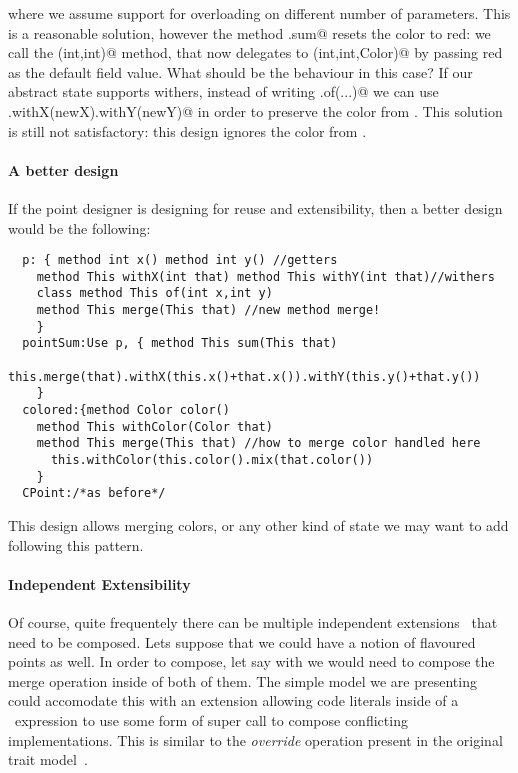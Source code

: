 \noindent 
where we assume support for overloading on different number of parameters.
This is a reasonable solution, however the method \Q@CPoint.sum@ resets
the color to red: we call the \Q@of(int,int)@ method, that now
delegates to \Q@of(int,int,Color)@ by passing red as the default field
value.  What should be the behaviour in this case?  If our abstract
state supports withers, instead of writing \Q@This.of(...)@ we can use
\Q@this.withX(newX).withY(newY)@ in order to preserve the color from
\Q@this@.  This solution is still not satisfactory: this design ignores
the color from \Q@that@.

\paragraph{A better design}
If the point designer is designing for reuse and extensibility, then 
a better design would be the following:  
\begin{lstlisting}
  p: { method int x() method int y() //getters
    method This withX(int that) method This withY(int that)//withers
    class method This of(int x,int y)
    method This merge(This that) //new method merge!
    }
  pointSum:Use p, { method This sum(This that)
      this.merge(that).withX(this.x()+that.x()).withY(this.y()+that.y())
    }
  colored:{method Color color()
    method This withColor(Color that)
    method This merge(This that) //how to merge color handled here
      this.withColor(this.color().mix(that.color())
    }
  CPoint:/*as before*/
\end{lstlisting}  
  This design allows merging colors, or any other kind of state we may want to add
  following this pattern.

\paragraph{Independent Extensibility}
  Of course, quite frequentely there can be multiple independent
  extensions~\cite{Zenger-Odersky2005} that need to be composed. Lets suppose that 
  we could have a notion of flavoured points as well.   
  In order to compose, let say \Q@colored@ with \Q@flavored@ we would
  need to compose the merge operation inside of both of them.
  The simple model we are presenting could accomodate this with an
  extension allowing code literals inside of a \use\ expression to use some form of super call to compose conflicting implementations. This is similar to the \emph{override} operation present in the original trait model~\cite{ducasse2006traits}.

